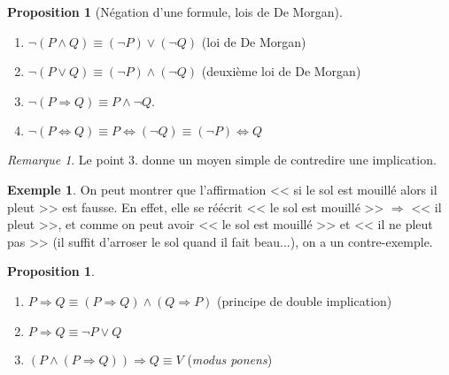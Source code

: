 \documentclass[11pt]{article}
\theoremstyle{definition}
\newtheorem{prop}[defn]{Proposition}
\newtheorem{exe}{Exemple}
\theoremstyle{remark}
\newtheorem{rem}{Remarque}
\begin{document}
\begin{prop}[Négation d'une formule, lois de De Morgan]\leavevmode
\begin{enumerate}
\item $\neg(P\land Q) \equiv (\neg P)\lor(\neg Q)$ (loi de De Morgan)
\item $\neg(P\lor Q) \equiv (\neg P)\land (\neg Q)$ (deuxième loi de De Morgan)
\item $\neg(P\Rightarrow Q)\equiv P\land\neg Q$.
\item $\neg(P\Longleftrightarrow Q) \equiv P\Longleftrightarrow (\neg Q) \equiv (\neg P) \Longleftrightarrow Q$
\end{enumerate}
\end{prop}

\begin{rem}
Le point 3. donne un moyen simple de contredire une implication.
\end{rem}

\begin{exe}
On peut montrer que l'affirmation << si le sol est mouillé alors il pleut >> est fausse. En effet, elle se réécrit << le sol est mouillé >> $\Rightarrow $ << il pleut >>, et comme on peut avoir << le sol est mouillé >> et << il ne pleut pas >> (il suffit d'arroser le sol quand il fait beau...), on a un contre-exemple.
\end{exe}

\begin{prop}\leavevmode
\begin{enumerate}
\item $P\Longrightarrow Q\equiv (P\Longrightarrow Q)\land(Q\Longrightarrow P)$ (principe de double implication)
\item $P\Rightarrow Q \equiv \neg P\lor Q$
\item $(P\land (P\Rightarrow Q))\Rightarrow Q\equiv V$ (\textit{modus ponens})
\end{enumerate}
\end{prop}
\end{document}
